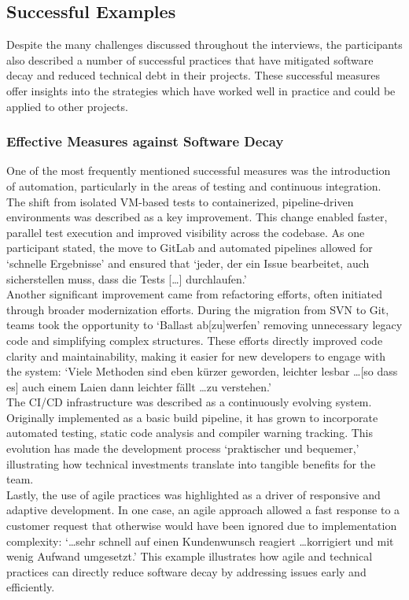 \subsection{Successful Examples}
Despite the many challenges discussed throughout the interviews, the participants also described a number of successful practices that have mitigated software decay and reduced technical debt in their projects. These successful measures offer insights into the strategies which have worked well in practice and could be applied to other projects.

\subsubsection{Effective Measures against Software Decay}
One of the most frequently mentioned successful measures was the introduction of automation, particularly in the areas of testing and continuous integration. The shift from isolated VM-based tests to containerized, pipeline-driven environments was described as a key improvement. This change enabled faster, parallel test execution
and improved visibility across the codebase. As one participant stated, the move to GitLab and automated pipelines allowed for `schnelle Ergebnisse' and ensured that `jeder, der ein Issue bearbeitet, auch sicherstellen muss, dass die Tests [\ldots] durchlaufen.'\\

Another significant improvement came from refactoring efforts, often initiated through broader modernization efforts. During the migration from SVN to Git, teams took the opportunity to `Ballast ab[zu]werfen' removing unnecessary legacy code and simplifying complex structures. These efforts directly improved code clarity and maintainability,
making it easier for new developers to engage with the system: `Viele Methoden sind eben kürzer geworden, leichter lesbar \ldots [so dass es] auch einem Laien dann leichter fällt \ldots zu verstehen.'\\

The CI/CD infrastructure was described as a continuously evolving system. Originally implemented as a basic build pipeline, it has grown to incorporate automated testing, static code analysis and compiler warning tracking. This evolution has made the development process `praktischer und bequemer,' illustrating how technical
investments translate into tangible benefits for the team.\\

Lastly, the use of agile practices was highlighted as a driver of responsive and adaptive development. In one case, an agile approach allowed a fast response to a customer request that otherwise would have been ignored due to implementation complexity: `\ldots sehr schnell auf einen Kundenwunsch reagiert \ldots korrigiert und mit wenig Aufwand umgesetzt.'
This example illustrates how agile and technical practices can directly reduce software decay by addressing issues early and efficiently.\\

